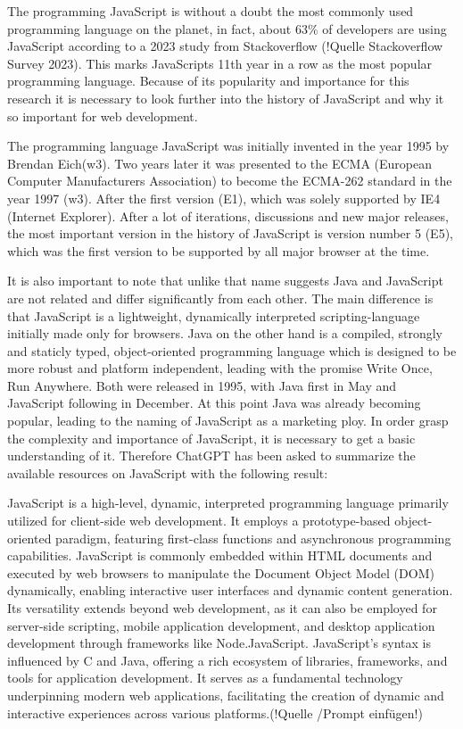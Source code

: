 The programming JavaScript is without a doubt the most commonly used programming language on the planet, in fact, about 63\% of developers are using JavaScript according to a 2023 study from Stackoverflow (!Quelle Stackoverflow Survey 2023). This marks JavaScripts 11th year in a row as the most popular programming language. Because of its popularity and importance for this research it is necessary to look further into the history of JavaScript and why it so important for web development.

The programming language JavaScript was initially invented in the year 1995 by Brendan Eich(w3). Two years later it was presented to the ECMA (European Computer Manufacturers Association) to become the ECMA-262 standard in the year 1997 (w3). After the first version (E1), which was solely supported by IE4 (Internet Explorer).
After a lot of iterations, discussions and new major releases, the most important version in the history of JavaScript is version number 5 (E5), which was the first version to be supported by all major browser at the time.

It is also important to note that unlike that name suggests Java and JavaScript are not related and differ significantly from each other.  The main difference is that JavaScript is a lightweight, dynamically interpreted scripting-language initially made only for browsers. Java on the other hand is a compiled, strongly and staticly typed, object-oriented programming language which is designed to be more robust and platform independent, leading with the promise \dq Write Once, Run Anywhere\dq . Both were released in 1995, with Java first in May and JavaScript following in December. At this point Java was already becoming popular, leading to the naming of JavaScript as a marketing ploy.
In order grasp the complexity and importance of JavaScript, it is necessary to get a basic understanding of it. Therefore ChatGPT has been asked to summarize the available resources on JavaScript with the following result:

\dq JavaScript is a high-level, dynamic, interpreted programming language primarily utilized for client-side web development. It employs a prototype-based object-oriented paradigm, featuring first-class functions and asynchronous programming capabilities. JavaScript is commonly embedded within HTML documents and executed by web browsers to manipulate the Document Object Model (DOM) dynamically, enabling interactive user interfaces and dynamic content generation. Its versatility extends beyond web development, as it can also be employed for server-side scripting, mobile application development, and desktop application development through frameworks like Node.JavaScript. JavaScript's syntax is influenced by C and Java, offering a rich ecosystem of libraries, frameworks, and tools for application development. It serves as a fundamental technology underpinning modern web applications, facilitating the creation of dynamic and interactive experiences across various platforms.\dq (!Quelle /Prompt einfügen!)

